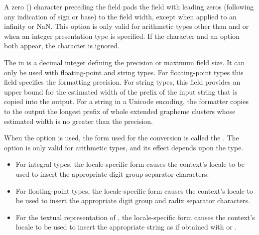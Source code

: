 \pnum
A zero () character
preceding the  field
pads the field with leading zeros (following any indication of sign or base)
to the field width,
except when applied to an infinity or NaN.
This option is only valid for
arithmetic types other than  and 
or when an integer presentation type is specified.
If the  character and an  option both appear,
the  character is ignored.
\begin{example}
\end{example}

\pnum
The  in
 is a decimal integer defining
the precision or maximum field size.
It can only be used with floating-point and string types.
For floating-point types this field specifies the formatting precision.
For string types, this field provides an upper bound
for the estimated width of the prefix of
the input string that is copied into the output.
For a string in a Unicode encoding,
the formatter copies to the output
the longest prefix of whole extended grapheme clusters
whose estimated width is no greater than the precision.

\pnum
When the  option is used, the form used for the conversion is called
the .
The  option is only valid for arithmetic types, and
its effect depends upon the type.
\begin{itemize}
\item
For integral types, the locale-specific form
causes the context's locale to be used
to insert the appropriate digit group separator characters.

\item
For floating-point types, the locale-specific form
causes the context's locale to be used
to insert the appropriate digit group and radix separator characters.

\item
For the textual representation of , the locale-specific form
causes the context's locale to be used
to insert the appropriate string as if obtained
with  or .
\end{itemize}

